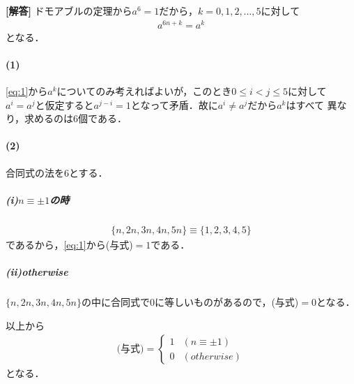 \documentclass[../../main.tex]{subfiles}
\begin{document}
\begin{oframed}
  
\end{oframed}

{\bf [解答]} ドモアブルの定理から$a^6=1$だから，$k=0,1,2,\dots,5$に対して
\begin{align}
  a^{6n+k}=a^k\label{eq:1}
\end{align}
となる．

\paragraph{(1)}
\cref{eq:1}から$a^k$についてのみ考えればよいが，このとき$0\le i<j\le5$に対して
$a^i=a^j$と仮定すると$a^{j-i}=1$となって矛盾．故に$a^i\not=a^j$だから$a^k$はすべて
異なり，求めるのは$6$個である．

\paragraph{(2)}
合同式の法を$6$とする．

\subparagraph{(i)$n\equiv \pm1$の時}
\begin{align}
  \{n,2n,3n,4n,5n\}\equiv\{1,2,3,4,5\}
\end{align}
であるから，\cref{eq:1}から(与式)$=1$である．

\subparagraph{(ii)otherwise}

$\{n,2n,3n,4n,5n\}$の中に合同式で$0$に等しいものがあるので，(与式)$=0$となる．
\casesend

以上から
\begin{align}
  \text{(与式)}=\left\{
    \begin{array}{ll}
      1 &  (n\equiv \pm1)     \\
      0 &  (otherwise)
    \end{array}
    \right.\tag{答}
  \end{align}
  となる．
  \newpage
  
\end{document}
